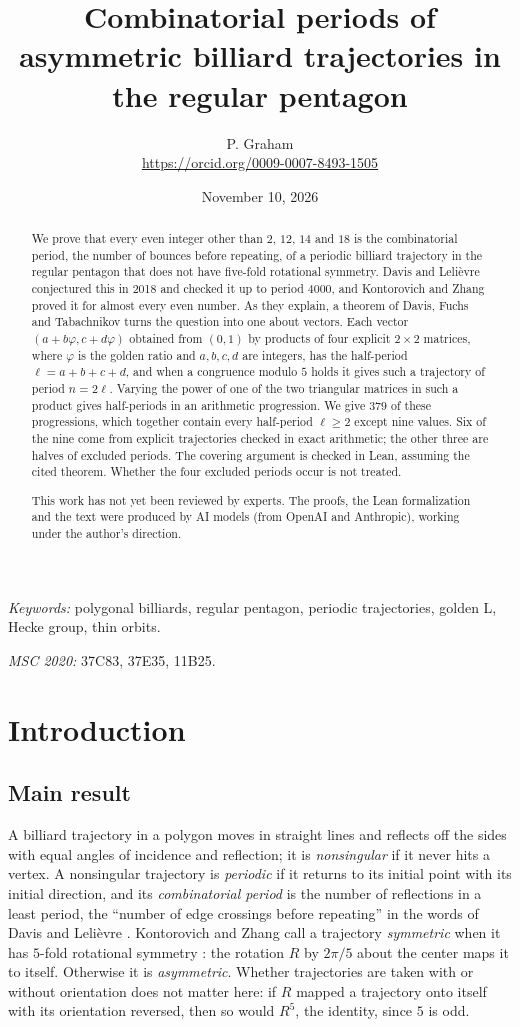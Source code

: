 \documentclass[11pt]{article}
\title{Combinatorial periods of asymmetric billiard trajectories in the regular pentagon}
\author{P. Graham\\ \small\url{https://orcid.org/0009-0007-8493-1505}}
\date{November 10, 2026}
\theoremstyle{definition}
\theoremstyle{remark}
\begin{document}
\maketitle
\begin{abstract}
We prove that every even integer other than $2$, $12$, $14$ and $18$ is
the combinatorial period, the number of bounces before repeating, of a
periodic billiard trajectory in the regular pentagon that does not have
five-fold rotational symmetry. Davis and Lelièvre conjectured this in 2018
and checked it up to period $4000$, and Kontorovich and Zhang proved it for
almost every even number. As they explain, a theorem of Davis, Fuchs and
Tabachnikov turns the question into one about vectors. Each vector
$(a+b\varphi,c+d\varphi)$ obtained from $(0,1)$ by products of four
explicit $2\times2$ matrices, where $\varphi$ is the golden ratio and
$a,b,c,d$ are integers, has the half-period $\ell=a+b+c+d$, and when a
congruence modulo $5$ holds it gives such a trajectory of period
$n=2\ell$. Varying the power of one of the two triangular matrices in such
a product gives half-periods in an arithmetic progression. We give $379$
of these progressions, which together contain every half-period $\ell\ge2$
except nine values. Six of the nine come from explicit trajectories
checked in exact arithmetic; the other three are halves of excluded
periods. The covering argument is checked in Lean, assuming the cited
theorem. Whether the four excluded periods occur is not treated.

This work has not yet been reviewed by experts.
The proofs, the Lean formalization and the text were produced by AI models
(from OpenAI and Anthropic), working under the author's direction.
\end{abstract}
\medskip
\noindent\textit{Keywords:} polygonal billiards, regular pentagon,
periodic trajectories, golden L, Hecke group, thin orbits.

\noindent\textit{MSC 2020:} 37C83, 37E35, 11B25.

\section{Introduction}

\subsection{Main result}
A billiard trajectory in a polygon moves in straight lines and reflects off
the sides with equal angles of incidence and reflection; it is
\emph{nonsingular} if it never hits a vertex. A nonsingular trajectory is
\emph{periodic} if it returns to its initial point with its initial
direction, and its \emph{combinatorial period} is the number of
reflections in a least period, the ``number of edge crossings before
repeating'' in the words of Davis and Lelièvre \cite[\S1]{DL}. Kontorovich and Zhang
call a trajectory \emph{symmetric} when it has $5$-fold rotational
symmetry \cite[\S1]{KZ}: the rotation $R$ by $2\pi/5$ about the center
maps it to itself. Otherwise it is \emph{asymmetric}. Whether trajectories
are taken with or without orientation does not matter here: if $R$ mapped
a trajectory onto itself with its orientation reversed, then so would
$R^5$, the identity, since $5$ is odd.
\end{document}
